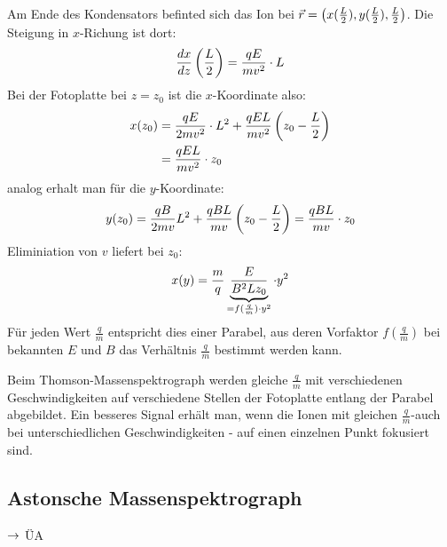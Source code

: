 Am Ende des Kondensators befinted sich das Ion bei $\vec{r}= \left(
x(\frac{L}{2}),y(\frac{L}{2}),\frac{L}{2}\right)$. Die Steigung in $x$-Richung ist
dort:
\begin{equation*}
     \frac{dx }{dz }\left( \frac{L}{2} \right) = \frac{qE}{mv^2} \cdot L
\end{equation*}
Bei der Fotoplatte bei $z=z_0$ ist die $x$-Koordinate also:
\begin{align*}
    x(z_0) &= \frac{qE}{2mv^2} \cdot L^2 + \frac{qEL}{mv^2} \left( z_0 -
    \frac{L}{2}\right) \\
    &= \frac{qEL}{mv^2}\cdot z_0
\end{align*}
analog erhalt man für die $y$-Koordinate:
\begin{equation*}
    y(z_0) = \frac{qB}{2mv}L^2 + \frac{qBL}{mv}\left( z_0 - \frac{L}{2}\right) =
    \frac{qBL}{mv} \cdot z_0
\end{equation*}
Eliminiation von $v$ liefert bei $z_0$:
\begin{equation*}
    x(y) = \frac{m}{q}\underbrace{\frac{E}{B^2 L z_0}}_{=f(\frac{q}{m}) \cdot
    y^2}\cdot y^2
\end{equation*}
Für jeden Wert $\frac{q}{m}$ entspricht dies einer Parabel, aus deren Vorfaktor
$f(\frac{q}{m})$ bei bekannten $E$ und $B$ das Verhältnis $\frac{q}{m}$
bestimmt werden kann.

Beim Thomson-Massenspektrograph werden gleiche $\frac{q}{m}$ mit verschiedenen
Geschwindigkeiten auf verschiedene Stellen der Fotoplatte entlang der Parabel
abgebildet. Ein besseres Signal erhält man, wenn die Ionen mit gleichen
$\frac{q}{m}$-auch bei unterschiedlichen Geschwindigkeiten - auf einen
einzelnen Punkt fokusiert sind. 

\subsection{Astonsche Massenspektrograph} %
\label{sub:Astonsche_Massenspektrograph}
$\rightarrow$ ÜA

